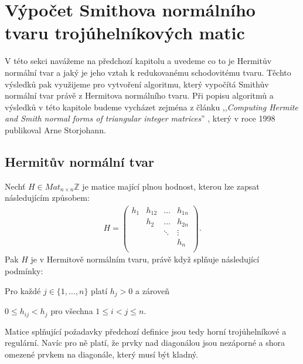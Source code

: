 \chapter{Výpočet Smithova normálního tvaru trojúhelníkových matic}

V této sekci navážeme na předchozí kapitolu a uvedeme co to je Hermitův normální
tvar a jaký je jeho vztah k redukovanému schodovitému tvaru.
Těchto výsledků pak využijeme pro vytvoření algoritmu, který vypočítá
Smithův normální tvar právě z Hermitova normálního tvaru.
Při popisu algoritmů a výsledků v této kapitole budeme vycházet zejména z článku
,,\textit{Computing Hermite and Smith normal forms of triangular integer matrices}''
\cite{SNF_Arne}, který v roce 1998 publikoval Arne Storjohann.


\section{Hermitův normální tvar}

\begin{defi}\label{hermi}
    Nechť $ H \in Mat_{n \times n}\mathbb{Z} $ je matice mající plnou hodnost,
    kterou lze zapsat následujícím způsobem:
    \begin{align}
        H =
        \begin{pmatrix}
            h_1 & h_{12} & \hdots & h_{1n} \\
                & h_2    & \hdots & h_{2n} \\
                &        & \ddots & \vdots \\
                &        &        & h_n    \\
        \end{pmatrix}.
    \end{align}
    Pak $ H $ je v Hermitově normálním tvaru, právě když splňuje následující
    podmínky:
    \begin{Cond}
        \item Pro každé $ j \in \{1,\dots, n\}$ platí $ h_j > 0 $ a zároveň
        \item $ 0 \leq h_{ij} < h_j $ pro všechna $ 1 \leq i < j \leq n $.
    \end{Cond}
\end{defi}
\begin{pozn}
    Matice splňující požadavky předchozí definice jsou tedy horní trojúhelníkové
    a regulární. Navíc pro ně platí, že prvky nad diagonálou jsou nezáporné a
    shora omezené prvkem na diagonále, který musí být kladný.
\end{pozn}

